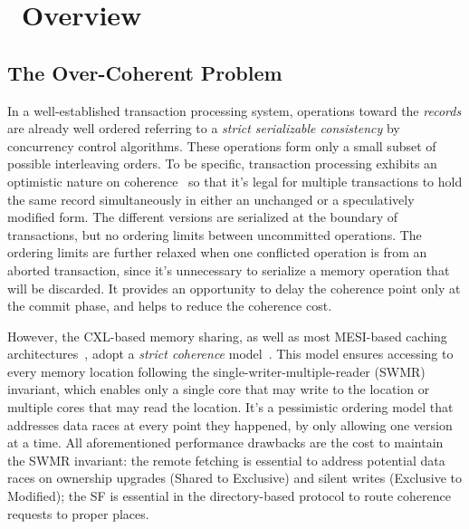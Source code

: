 \section{\name~Overview}    \label{sec:primitive}


\ifx\stale\undefined
\subsection{The Over-Coherent Problem}
In a well-established transaction processing system, operations toward the \textit{records} are already well ordered referring to a \textit{strict serializable consistency} by concurrency control algorithms. 
These operations form only a small subset of possible interleaving orders.
To be specific, transaction processing exhibits an optimistic nature on coherence~\cite{farm_nsdi14, drtm, compromise, timestone_asplos20, calvin_sigmod12, cicadia_sigmod17, tm_book, rss_sosp21, hekaton_sigmod13} so that it's legal for multiple transactions to hold the same record simultaneously in either an unchanged or a speculatively modified form. The different versions are serialized at the boundary of transactions, but no ordering limits between uncommitted operations. 
The ordering limits are further relaxed when one conflicted operation is from an aborted transaction, since it's unnecessary to serialize a memory operation that will be discarded. 
It provides an opportunity to delay the coherence point only at the commit phase, and helps to reduce the coherence cost. 

However, 
the CXL-based memory sharing, as well as most MESI-based caching architectures~\cite{rvweak_pact17, armcm_cmb12, powercm_pldi11, rvweak_isca18, gam, txcache_osdi10}, adopt a \textit{strict coherence} model~\cite{munin_ppopp90, rtm_isca14}. This model ensures accessing to every memory location following the single-writer-multiple-reader (SWMR) invariant, which enables only a single core that may write to the location or multiple cores that may read the location. 
It's a pessimistic ordering model that addresses data races at every point they happened, by only allowing one version at a time. 
All aforementioned performance drawbacks are the cost to maintain the SWMR invariant: the remote fetching is essential to address potential data races on ownership upgrades (Shared to Exclusive) and silent writes (Exclusive to Modified); the SF is essential in the directory-based protocol to route coherence requests to proper places. 


